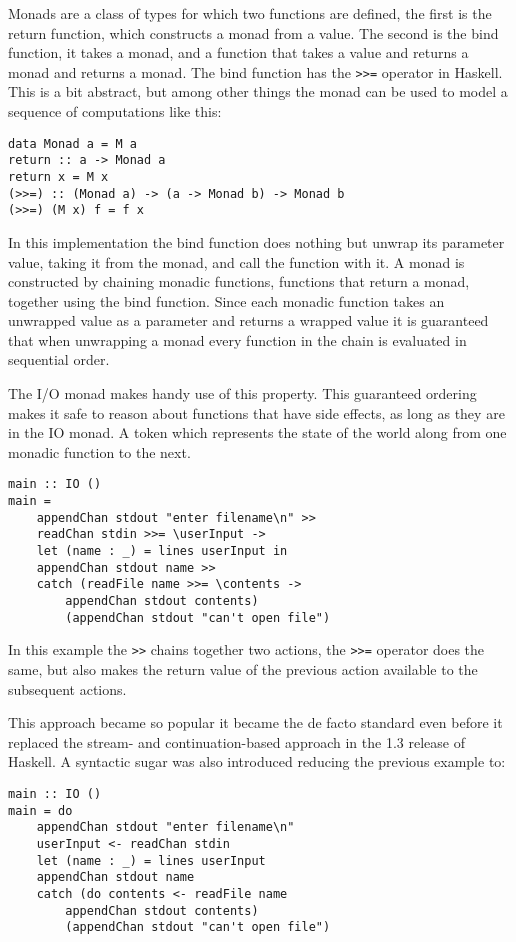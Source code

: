 Monads are a class of types for which two functions are defined, the first is the return function, which constructs a monad from a value.
 The second is the bind function, it takes a monad, and a function that takes a value and returns a monad and returns a monad.
The bind function has the \lstinline{>>=} operator in Haskell.
 This is a bit abstract, but among other things the monad can be used to model a sequence of computations like this:

\begin{lstlisting}[caption={Sequence of computations monad}]
data Monad a = M a
return :: a -> Monad a
return x = M x
(>>=) :: (Monad a) -> (a -> Monad b) -> Monad b
(>>=) (M x) f = f x
\end{lstlisting}

In this implementation the bind function does nothing but unwrap its parameter value, taking it from the monad, and call the function with it.
A monad is constructed by chaining monadic functions, functions that return a monad, together using the bind function. Since each monadic function takes an unwrapped value as a parameter and returns a wrapped value it is guaranteed that when unwrapping a monad every function in the chain is evaluated in sequential order.

The I/O monad makes handy use of this property. This guaranteed ordering makes it safe to reason about functions that have side effects, as long as they are in the IO monad. 
A token which represents the state of the world along from one monadic function to the next.

\begin{lstlisting}[caption={Example of monadic I/O in Haskell}]
main :: IO ()
main =
	appendChan stdout "enter filename\n" >>
	readChan stdin >>= \userInput ->
	let (name : _) = lines userInput in
	appendChan stdout name >>
	catch (readFile name >>= \contents ->
		appendChan stdout contents)
		(appendChan stdout "can't open file")
\end{lstlisting}

In this example the \lstinline!>>! chains together two actions, the \lstinline!>>=! operator does the same, but also makes the return value of the previous action available to the subsequent actions.

This approach became so popular it became the de facto standard even before it replaced the stream- and continuation-based approach in the 1.3 release of Haskell\cite{haskell12to13}. A syntactic sugar was also introduced reducing the previous example to:

\begin{lstlisting}[caption={Example of monadic I/O in Haskell}]
main :: IO ()
main = do
	appendChan stdout "enter filename\n"
	userInput <- readChan stdin
	let (name : _) = lines userInput
	appendChan stdout name
	catch (do contents <- readFile name
		appendChan stdout contents)
		(appendChan stdout "can't open file")
\end{lstlisting}
